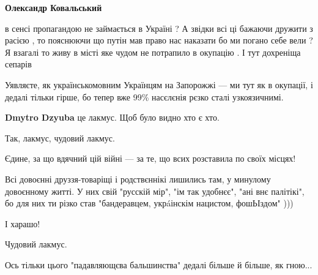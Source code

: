 \begin{itemize}
\begin{itemize}
\textbf{Олександр Ковальський} 

в сенсі пропагандою не займається в Україні ? А звідки всі ці бажаючи дружити з
расією , то пояснюючи що путін мав право нас наказати бо ми погано себе вели ?
Я взагалі то живу в місті яке чудом не потрапило в окупацію . І тут дохреніща
сепарів

\end{itemize}

 

Уявляєте, як українськомовним Українцям на Запорожжі — ми тут як в окупації, і
дедалі тільки гірше, бо тепер вже 99\% насєлєнія рєзко сталі узкоязичнимі.

\begin{itemize}
 
\textbf{Dmytro Dzyuba} це лакмус. Щоб було видно хто є хто.

 

Так, лакмус, чудовий лакмус.

Єдине, за що вдячний цій війні — за те, що всих розставила по своїх місцях!

Всі довоєнні друззя-товаріщі і родствєннікі лишились там, у минулому довоєнному
житті. У них свій "русскій мір", "ім так удобнєє", "ані внє палітікі", бо для
них ти різко став "бандеравцем, укрáінскім нацистом, фошЬІздом" )))

І харашо!

Чудовий лакмус.

Ось тільки цього "падавляющєва бальшинства" дедалі більше й більше, як гною...

 


\end{itemize}
\end{itemize}
